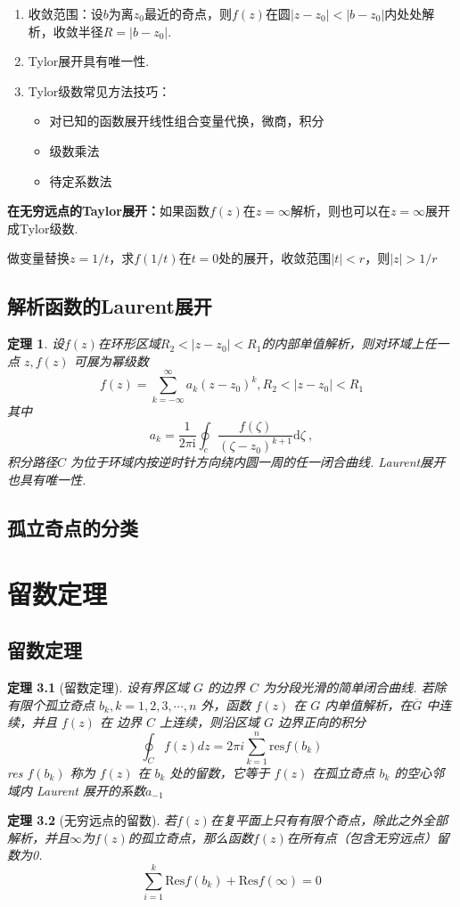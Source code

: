 \documentclass[11pt, a4paper, twoside]{ctexbook}
\newtheorem{theorem}{定理}[section]
\begin{document}
\begin{enumerate}
    \item 收敛范围：设$b$为离$z_0$最近的奇点，则$f(z)$在圆$|z-z_0| < |b-z_0|$内处处解析，收敛半径$R = |b-z_0|$.
    \item Tylor展开具有唯一性.
    \item Tylor级数常见方法技巧：\begin{itemize}
    \item 对已知的函数展开线性组合变量代换，微商，积分
    \item 级数乘法
    \item 待定系数法
    \end{itemize}
\end{enumerate}

\textbf{在无穷远点的Taylor展开：}如果函数$f(z)$在$z = \infty$解析，则也可以在$z = \infty$展开成Tylor级数.

做变量替换$z = 1/t$，求$f(1/t)$在$t = 0$处的展开，收敛范围$|t| < r$，则$|z|>1/r$
\section{解析函数的Laurent展开}
\begin{theorem}
    设$f(z)$在环形区域$R_2<|z-z_0|<R_1$的内部单值解析，则对环域上任一点 $z,f(z)$ 可展为幂级数
$$f(z)=\sum_{k=-\infty}^\infty a_k\left(z-z_0\right)^k,R_2 < |z-z_0|<R_1$$
其中
$$
a_k=\frac1{2\pi\mathrm{i}}\oint_{c}\frac{f(\zeta)}{\left(\zeta-z_0\right)^{k+1}}\mathrm{d}\zeta\:,
$$
积分路径$C$ 为位于环域内按逆时针方向绕内圆一周的任一闭合曲线.
Laurent展开也具有唯一性.
\end{theorem}
\section{孤立奇点的分类}

\renewcommand{\cleardoublepage}{}
\renewcommand{\clearpage}{}
\chapter{留数定理}
\section{留数定理}
\begin{theorem}[留数定理]
  设有界区域 $G$ 的边界 $C$ 为分段光滑的简单闭合曲线. 若除有限个孤立奇点 $b_k,k=1,2,3,\cdots,n$ 外，函数 $f(z)$ 在 $G$ 内单值解析，在$\overline{G}$ 中连续，并且 $f(z)$ 在
边界 $C$ 上连续，则沿区域 $G$ 边界正向的积分
$$\boxed{\oint_C f(z)dz = 2\pi i \sum_{k = 1}^n \mathrm{res}f(b_k)}$$
  res $f(b_k)$ 称为 $f(z)$ 在 $b_k$ 处的留数，它等于 $f(z)$ 在孤立奇点 $b_k$ 的空心邻域内 Laurent 展开的系数$a_{-1}$
\end{theorem}
\begin{theorem}[无穷远点的留数]
    若$f(z)$在复平面上只有有限个奇点，除此之外全部解析，并且$\infty$为$f(z)$的孤立奇点，那么函数$f(z)$在所有点（包含无穷远点）留数为0.
    $$\sum_{i = 1}^k\mathrm{Res}f(b_k) + \mathrm{Res}f(\infty ) = 0$$
\end{theorem}
\end{document}
